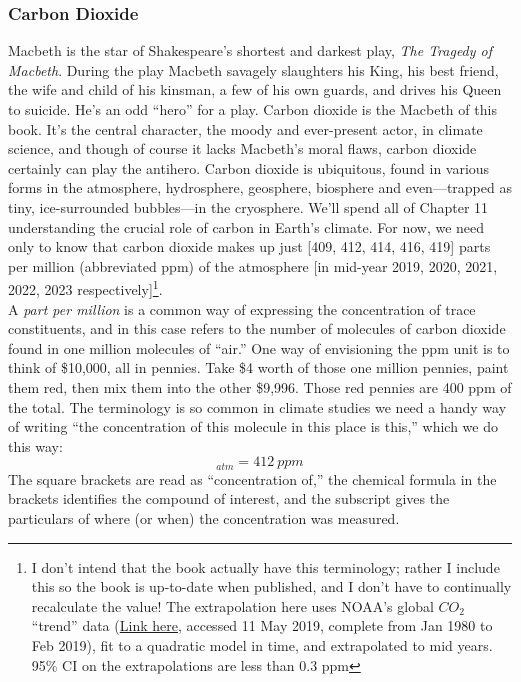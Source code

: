 \documentclass[amstex,12pt]{book}
\begin{document}
\subsubsection{Carbon Dioxide}
Macbeth is the star of Shakespeare's shortest and darkest play, \textit{The Tragedy of Macbeth}. During the play Macbeth savagely slaughters his King, his best friend, the wife and child of his kinsman, a few of his own guards, and drives his Queen to suicide. He's an odd ``hero'' for a play. Carbon dioxide is the Macbeth of this book. It's the central character, the moody and ever-present actor, in climate science, and though of course it lacks Macbeth’s moral flaws, carbon dioxide certainly can play the antihero. Carbon dioxide is ubiquitous, found in various forms in the atmosphere, hydrosphere, geosphere, biosphere and even---trapped as tiny, ice-surrounded bubbles---in the cryosphere. We'll spend all of Chapter 11 understanding the crucial role of carbon in Earth's climate. For now, we need only to know that carbon dioxide makes up just [409, 412, 414, 416, 419] parts per million (abbreviated ppm) of the atmosphere [in mid-year 2019, 2020, 2021, 2022, 2023 respectively]\footnote{I don't intend that the book actually have this terminology; rather I include this so the book is up-to-date when published, and I don't have to continually recalculate the value! The extrapolation here uses NOAA's global $CO_2$ ``trend'' data (\href{ftp://aftp.cmdl.noaa.gov/products/trends/co2/co2_mm_gl.txt}{Link here}, accessed 11 May 2019, complete from Jan 1980 to Feb 2019), fit to a quadratic model in time, and extrapolated to mid years. 95\% CI on the extrapolations are less than 0.3 ppm}.\\
A \emph{part per million} is a common way of expressing the concentration of trace constituents, and in this case refers to the number of molecules of carbon dioxide found in one million molecules of ``air.'' One way of envisioning the ppm unit is to think of \$10,000, all in pennies. Take \$4 worth of those one million pennies, paint them red, then mix them into the other \$9,996. Those red pennies are 400 ppm of the total. The terminology is so common in climate studies we need a handy way of writing ``the concentration of this molecule in this place is this,'' which we do this way:
\begin{equation}
	[CO_2]_{atm}=412\ ppm
\end{equation}
The square brackets are read as ``concentration of,'' the chemical formula in the brackets identifies the compound of interest, and the subscript gives the particulars of where (or when) the concentration was measured.
\end{document}
